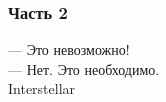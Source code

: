 \documentclass[12pt, a4paper]{article}\usepackage[]{graphicx}\usepackage[]{color}
\begin{document}
\begin{enumerate}
\begin{figure}
\begin{tikzpicture}[scale = 0.025]
  
\end{tikzpicture}
\end{figure}



\end{enumerate}


\subsubsection*{Часть 2}

\begin{flushright}
 — Это невозможно! \\
— Нет. Это необходимо.\\
\textcopyright \hspace{0.1cm} Interstellar
\end{flushright}
\end{document}
